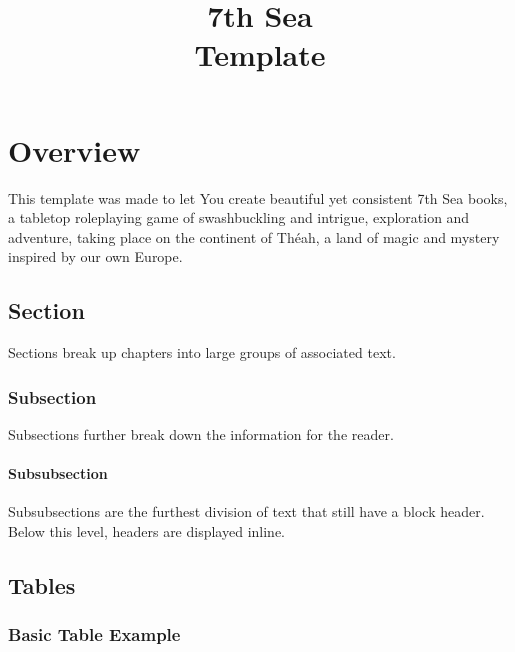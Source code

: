 \documentclass[10pt,a4paper,twoside,twocolumn,openany]{book}
\title{7th Sea \\
	\Huge Template}
\author{}
\date{}
\makeatletter
\newcommand{\setTheme}[1]{%
	\IfStrEqCase{#1}{%
		{theah}{\SetThemeVariables{theah}}%
		{khitai}{\SetThemeVariables{khitai}}%
		{1knations}{\SetThemeVariables{1knations}}%
		{newWorld}{\SetThemeVariables{newWorld}}%
		{ifri}{\SetThemeVariables{ifri}}%
		{crescentEmpire}{\SetThemeVariables{crescentEmpire}}%
		{citiesOfWonder}{\SetThemeVariables{citiesOfWonder}}%
		{pirateNations}{\SetThemeVariables{pirateNations}}%
		{priceOfArrogance}{\SetThemeVariables{priceOfArrogance}}%
	}%
}
\renewcommand\tableofcontents{%
	\chapter*{\centering\normalfont\Huge\contentsname}
	\@starttoc{toc}%
}
\makeatother
\begin{document}
    \maketitle
    
    \clearpage              %
    \thispagestyle{empty}   %
    \tableofcontents
    
    \clearpage
    \thispagestyle{empty} 
    
    \chapter{Overview}
    
    This template was made to let You create beautiful yet consistent 7th Sea books,
    a tabletop roleplaying game of swashbuckling
    and intrigue, exploration and adventure, taking place on the
    ­continent of Théah, a land of magic and mystery inspired by
    our own Europe.\\
		
	
    \section{Section}
    Sections break up chapters into large groups of associated text.
    
    \subsection{Subsection}
    Subsections further break down the information for the reader.
    
    \subsubsection{Subsubsection}
    Subsubsections are the furthest division of text that still have a block header. Below this level, headers are displayed inline.
	
    \section{Tables}

    \subsection{Basic Table Example}
    
\end{document}
